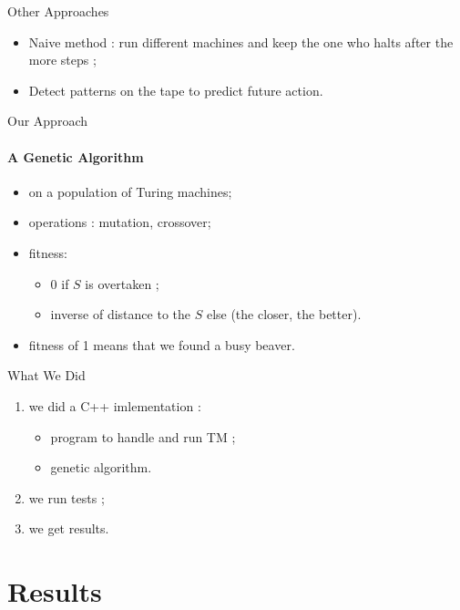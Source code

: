\documentclass{beamer}
\begin{document}
\begin{frame}{Other Approaches}

\begin{itemize}
\item Naive method : run different machines and keep the one who halts after the more steps ; %
\item Detect patterns on the tape to predict future action.
\end{itemize}

\end{frame}

\begin{frame}{Our Approach}
\framesubtitle{A Genetic Algorithm}

\begin{itemize}
\item on a population of Turing machines;
\item operations : mutation, crossover;
\item fitness:
  \begin{itemize}
  \item 0 if $S$ is overtaken ;
  \item inverse of distance to the $S$ else (the closer, the better).
  \end{itemize}
\item fitness of 1 means that we found a busy beaver.
\end{itemize}

\end{frame}

\begin{frame}{What We Did}

\begin{enumerate}
\item we did a C++ imlementation :
  \begin{itemize}
  \item program to handle and run TM ;
  \item genetic algorithm.
  \end{itemize}
\item we run tests ;
\item we get results.
\end{enumerate}
\end{frame}

\section{Results}
\end{document}
